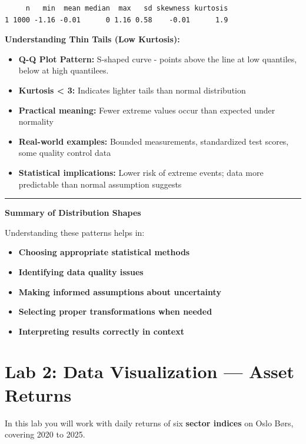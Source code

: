 \documentclass[
  12pt,
  letterpaper,
]{scrbook}
\providecommand{\tightlist}{%
  \setlength{\itemsep}{0pt}\setlength{\parskip}{0pt}}
\renewcommand{\tightlist}{\setlength{\itemsep}{0.5\baselineskip}\setlength{\parskip}{0.2\baselineskip}}
\theoremstyle{plain}
\theoremstyle{definition}
\theoremstyle{remark}
\begin{document}
\begin{verbatim}
     n   min  mean median  max   sd skewness kurtosis
1 1000 -1.16 -0.01      0 1.16 0.58    -0.01      1.9
\end{verbatim}

\textbf{Understanding Thin Tails (Low Kurtosis):}

\begin{itemize}
\tightlist
\item
  \textbf{Q-Q Plot Pattern:} S-shaped curve - points above the line at
  low quantiles, below at high quantilees.
\item
  \textbf{Kurtosis \textless{} 3:} Indicates lighter tails than normal
  distribution
\item
  \textbf{Practical meaning:} Fewer extreme values occur than expected
  under normality
\item
  \textbf{Real-world examples:} Bounded measurements, standardized test
  scores, some quality control data
\item
  \textbf{Statistical implications:} Lower risk of extreme events; data
  more predictable than normal assumption suggests
\end{itemize}

\begin{center}\rule{0.5\linewidth}{0.5pt}\end{center}

\textbf{Summary of Distribution Shapes}

Understanding these patterns helps in:

\begin{itemize}
\tightlist
\item
  \textbf{Choosing appropriate statistical methods}
\item
  \textbf{Identifying data quality issues}
\item
  \textbf{Making informed assumptions about uncertainty}
\item
  \textbf{Selecting proper transformations when needed}
\item
  \textbf{Interpreting results correctly in context}
\end{itemize}

\chapter{Lab 2: Data Visualization --- Asset
Returns}\label{lab-2-data-visualization-asset-returns}

In this lab you will work with daily returns of six \textbf{sector
indices} on Oslo Børs, covering 2020 to 2025.
\end{document}
